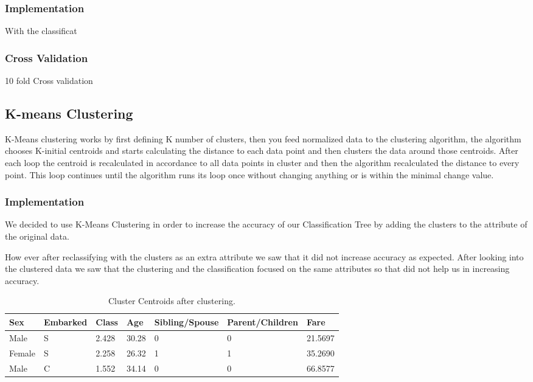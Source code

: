 \documentclass[a4paper,11pt]{article}
\begin{document}
\subsubsection{Implementation}
With the classificat 
\subsubsection{Cross Validation}
10 fold Cross validation
\subsection{K-means Clustering}
K-Means clustering\cite{KMeans} works by first defining K number of clusters, then you feed normalized data to the clustering algorithm, the algorithm chooses K-initial centroids and starts calculating the distance to each data point and then clusters the data around those centroids. After each loop the centroid is recalculated in accordance to all data points in cluster and then the algorithm recalculated the distance to every point. This loop continues until the algorithm runs its loop once without changing anything or is within the minimal change value.
\subsubsection{Implementation}
We decided to use K-Means Clustering in order to increase the accuracy of our Classification Tree by adding the clusters to the attribute of the original data.

How ever after reclassifying with the clusters as an extra attribute we saw that it did not increase accuracy as expected. After looking into the clustered data we saw that the clustering and the classification focused on the same attributes so that did not help us in increasing accuracy.

\begin{table}[h]
\begin{tabular}{|l|l|l|l|l|l|l|}
\hline
Sex & Embarked & Class & Age & Sibling/Spouse & Parent/Children & Fare\\
\hline
Male & S & 2.428 & 30.28 & 0 & 0 & 21.5697\\
Female & S & 2.258 & 26.32 & 1 & 1 & 35.2690\\
Male & C & 1.552 & 34.14 & 0 & 0 & 66.8577\\
\hline
\end{tabular}
\caption{Cluster Centroids after clustering.}
\label{clusterCentroids}
\end{table}
\end{document}
